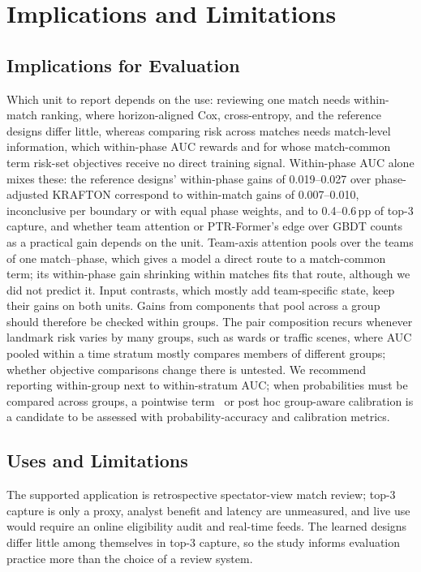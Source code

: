 \documentclass[sigconf,anonymous,nonacm]{acmart}
\begin{document}
\section{Implications and Limitations}
\label{sec:discussion}
\subsection{Implications for Evaluation}
\label{sec:discussion:implications}
Which unit to report depends on the use: reviewing one match needs within-match ranking, where horizon-aligned Cox, cross-entropy, and the reference designs differ little, whereas comparing risk across matches needs match-level information, which within-phase AUC rewards and for whose match-common term risk-set objectives receive no direct training signal. Within-phase AUC alone mixes these: the reference designs' within-phase gains of 0.019--0.027 over phase-adjusted KRAFTON correspond to within-match gains of 0.007--0.010, inconclusive per boundary or with equal phase weights, and to 0.4--0.6\,pp of top-3 capture, and whether team attention or PTR-Former's edge over GBDT counts as a practical gain depends on the unit. Team-axis attention pools over the teams of one match--phase, which gives a model a direct route to a match-common term; its within-phase gain shrinking within matches fits that route, although we did not predict it. Input contrasts, which mostly add team-specific state, keep their gains on both units. Gains from components that pool across a group should therefore be checked within groups. The pair composition recurs whenever landmark risk varies by many groups, such as wards or traffic scenes, where AUC pooled within a time stratum mostly compares members of different groups; whether objective comparisons change there is untested. We recommend reporting within-group next to within-stratum AUC; when probabilities must be compared across groups, a pointwise term~\cite{Bai23} or post hoc group-aware calibration is a candidate to be assessed with probability-accuracy and calibration metrics.

\subsection{Uses and Limitations}
\label{sec:discussion:limits}
The supported application is retrospective spectator-view match review; top-3 capture is only a proxy, analyst benefit and latency are unmeasured, and live use would require an online eligibility audit and real-time feeds. The learned designs differ little among themselves in top-3 capture, so the study informs evaluation practice more than the choice of a review system.
\end{document}
